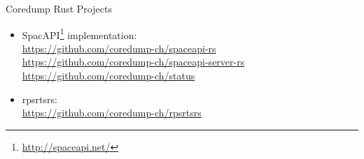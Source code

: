 \begin{frame}{Coredump Rust Projects}
\begin{itemize}
    \item SpacAPI\footnote{\url{http://spaceapi.net/}} implementation:\\
      \url{https://github.com/coredump-ch/spaceapi-rs}\\
      \url{https://github.com/coredump-ch/spaceapi-server-rs}\\
      \url{https://github.com/coredump-ch/status}
    \item rpsrtsrs:\\
      \url{https://github.com/coredump-ch/rpsrtsrs}
\end{itemize}
\end{frame}
